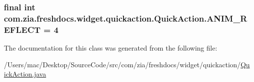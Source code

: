 \hypertarget{classcom_1_1zia_1_1freshdocs_1_1widget_1_1quickaction_1_1_quick_action_a875969b96fae990544179be5f4de4ba0}{
\subsubsection[{A\-N\-I\-M\-\_\-\-R\-E\-F\-L\-E\-C\-T}]{\setlength{\rightskip}{0pt plus 5cm}final int com.\-zia.\-freshdocs.\-widget.\-quickaction.\-Quick\-Action.\-A\-N\-I\-M\-\_\-\-R\-E\-F\-L\-E\-C\-T = 4\hspace{0.3cm}{\ttfamily [static]}}}\label{classcom_1_1zia_1_1freshdocs_1_1widget_1_1quickaction_1_1_quick_action_a875969b96fae990544179be5f4de4ba0}


The documentation for this class was generated from the following file\-:\begin{DoxyCompactItemize}
\item 
/\-Users/mac/\-Desktop/\-Source\-Code/src/com/zia/freshdocs/widget/quickaction/\hyperlink{_quick_action_8java}{Quick\-Action.\-java}\end{DoxyCompactItemize}
